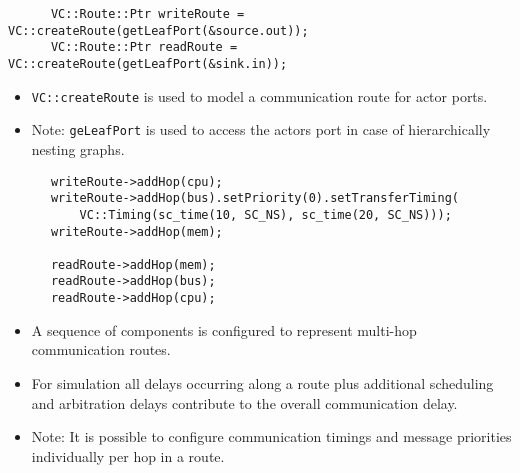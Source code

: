 \begin{frame}[fragile=singleslide]
\begin{lstlisting}
      VC::Route::Ptr writeRoute = VC::createRoute(getLeafPort(&source.out));
      VC::Route::Ptr readRoute = VC::createRoute(getLeafPort(&sink.in));
\end{lstlisting}
\begin{itemize}
\item \lstinline!VC::createRoute! is used to model a communication route for actor ports.
\item Note: \lstinline!geLeafPort! is used to access the actors port in case of hierarchically nesting  graphs.
\end{itemize}
\end{frame}


\begin{frame}[fragile=singleslide]
\begin{lstlisting}
      writeRoute->addHop(cpu);
      writeRoute->addHop(bus).setPriority(0).setTransferTiming(
          VC::Timing(sc_time(10, SC_NS), sc_time(20, SC_NS)));
      writeRoute->addHop(mem);

      readRoute->addHop(mem);
      readRoute->addHop(bus);
      readRoute->addHop(cpu);
\end{lstlisting}
\begin{itemize}
\item A sequence of components is configured to represent multi-hop communication routes.
\item For simulation all delays occurring along a route plus additional scheduling and arbitration delays contribute to the overall communication delay.
\item Note: It is possible to configure communication timings and message priorities individually per hop in a route.
\end{itemize}
\end{frame}


